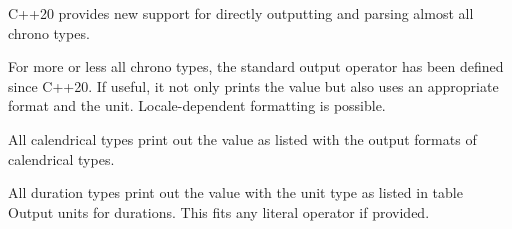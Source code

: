 
C++20 provides new support for directly outputting and parsing almost all chrono types.


For more or less all chrono types, the standard output operator has been defined since C++20. If useful, it not only prints the value but also uses an appropriate format and the unit. Locale-dependent formatting is possible.

All calendrical types print out the value as listed with the output formats of calendrical types.

All duration types print out the value with the unit type as listed in table Output units for durations. This fits any literal operator if provided.

